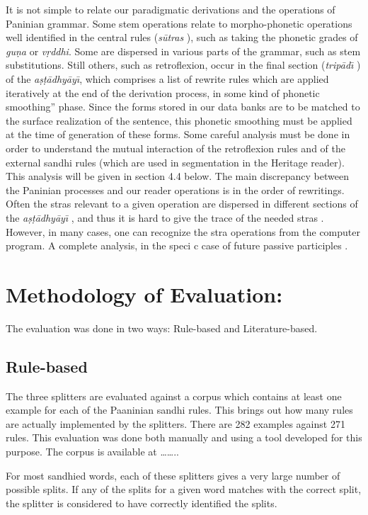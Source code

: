 \documentclass[11pt]{article}
\begin{document}
It is not simple to relate our paradigmatic derivations and the operations of Paninian grammar. Some stem operations relate to morpho-phonetic operations well identified in the central rules (\textit{s\={u}tras} ), such as taking the phonetic grades of \textit{gu\d{n}a} or \textit{v\d{r}ddhi}. Some are dispersed in various parts of the grammar, such as stem substitutions. Still others, such as retroflexion, occur in the  final section (\textit{trip\={a}d\={\i}} )  of  the \textit{a\d{s}\d{t}\={a}dhy\={a}y\={\i}},  which  comprises  a  list  of  rewrite  rules  which  are applied iteratively at the end of the derivation process, in some kind of phonetic smoothing'' phase. Since the forms stored in our data banks are to be matched to the surface realization of the sentence, this phonetic smoothing must be applied at the time of generation of these forms. Some careful analysis must be done in order to understand the mutual interaction of the retroflexion rules and of the external sandhi rules (which are used in segmentation in the Heritage reader). This analysis will be given in section 4.4 below. The main discrepancy between the Paninian processes and our reader operations is in the order of rewritings. Often the stras relevant to a given operation are dispersed in different sections of the \textit{a\d{s}\d{t}\={a}dhy\={a}y\={\i}} , and thus it is hard to give the trace of the needed stras . However, in many cases, one can recognize the stra operations from the computer program. A complete analysis, in the speci c case of future passive participles .


\section{Methodology of Evaluation:}
\label{sect:methodology}

The evaluation was done in two ways: Rule-based and Literature-based. 


\subsection{Rule-based}
The three splitters are evaluated against a corpus which contains at least one example for each of the Paaninian sandhi rules. This brings out how many rules are actually implemented by the splitters. There are 282 examples against 271 rules. This evaluation was done both manually and using a tool developed for this purpose. The corpus is available at ……..

For most sandhied words, each of these splitters gives a very large number of possible splits. If any of the splits for a given word matches with the correct split, the splitter is considered to have correctly identified the splits. 
\end{document}
